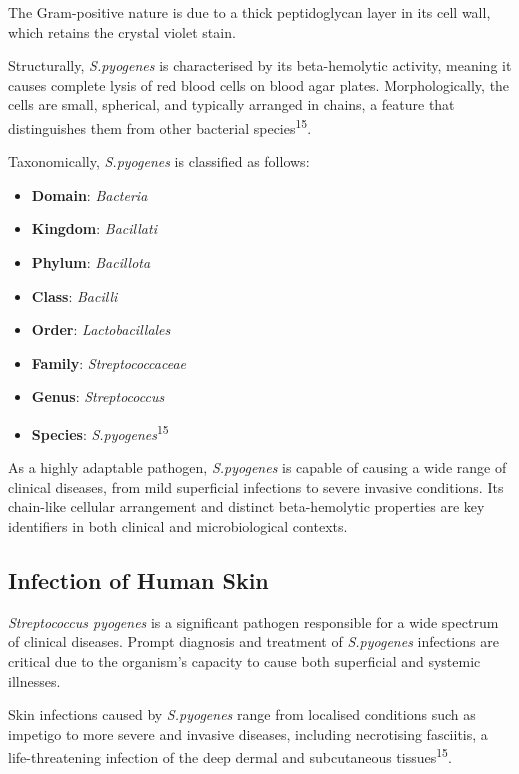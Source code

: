 \documentclass[
]{article}
\begin{document}
The Gram-positive nature is due to a thick peptidoglycan layer in its
cell wall, which retains the crystal violet stain.

Structurally, \emph{S.pyogenes} is characterised by its beta-hemolytic
activity, meaning it causes complete lysis of red blood cells on blood
agar plates. Morphologically, the cells are small, spherical, and
typically arranged in chains, a feature that distinguishes them from
other bacterial species\textsuperscript{15}.

Taxonomically, \emph{S.pyogenes} is classified as follows:

\begin{itemize}
\item
  \textbf{Domain}: \emph{Bacteria}
\item
  \textbf{Kingdom}: \emph{Bacillati}
\item
  \textbf{Phylum}: \emph{Bacillota}
\item
  \textbf{Class}: \emph{Bacilli}
\item
  \textbf{Order}: \emph{Lactobacillales}
\item
  \textbf{Family}: \emph{Streptococcaceae}
\item
  \textbf{Genus}: \emph{Streptococcus }
\item
  \textbf{Species}: \emph{S.pyogenes}\textsuperscript{15}
\end{itemize}

As a highly adaptable pathogen, \emph{S.pyogenes} is capable of causing
a wide range of clinical diseases, from mild superficial infections to
severe invasive conditions. Its chain-like cellular arrangement and
distinct beta-hemolytic properties are key identifiers in both clinical
and microbiological contexts.

\subsection{Infection of Human Skin}\label{infection-of-human-skin}

\emph{Streptococcus pyogenes} is a significant pathogen responsible for
a wide spectrum of clinical diseases. Prompt diagnosis and treatment of
\emph{S.pyogenes} infections are critical due to the organism's capacity
to cause both superficial and systemic illnesses.

Skin infections caused by \emph{S.pyogenes} range from localised
conditions such as impetigo to more severe and invasive diseases,
including necrotising fasciitis, a life-threatening infection of the
deep dermal and subcutaneous tissues\textsuperscript{15}.
\end{document}
